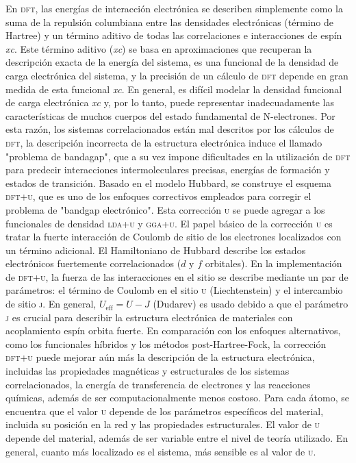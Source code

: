 En \textsc{dft}, las energías de interacción electrónica se describen simplemente como la suma de la repulsión columbiana  entre las densidades electrónicas (término de Hartree) y un término aditivo de todas las correlaciones e interacciones de espín \textit{xc}. Este término aditivo (\textit{xc}) se basa en aproximaciones que  recuperan la descripción exacta de la energía del sistema, es una funcional de la densidad de carga electrónica del sistema, y la precisión de un cálculo de \textsc{dft} depende en gran medida de esta funcional \textit{xc}. En general, es difícil modelar la densidad funcional de carga electrónica \textit{xc} y, por lo tanto, puede representar inadecuadamente las características de muchos cuerpos del estado fundamental de N-electrones. Por esta razón, los sistemas correlacionados están mal descritos por los cálculos de \textsc{dft}, la descripción incorrecta de la estructura electrónica induce el llamado "problema de bandagap", que a su vez impone dificultades en la utilización de \textsc{dft} para predecir interacciones intermoleculares precisas, energías de formación y estados de transición\cite{Tolba2018}. Basado en el modelo Hubbard, se construye el esquema \textsc{dft+u}, que es uno de los enfoques correctivos empleados para corregir el problema de "bandgap electrónico". Esta corrección \textsc{u} se puede agregar a los funcionales de densidad  \textsc{lda+u} y \textsc{gga+u}. El papel básico de la corrección \textsc{u} es tratar la fuerte interacción de Coulomb de sitio de los electrones localizados con un término adicional. El Hamiltoniano de Hubbard describe los estados electrónicos fuertemente correlacionados ($ d $ y $ f $ orbitales). En la implementación de \textsc{dft+u}, la fuerza de las interacciones en el sitio se describe mediante un par de parámetros: el término de Coulomb en el sitio \textsc{u} (Liechtenstein\cite{Lichtenstein1995StrongOrdering}) y el intercambio de sitio \textsc{j}. En general, $ U_{\text{eff}}=U-J$ (Dudarev\cite{Dudarev1998Electron-energy-lossStudy}) es usado debido a que el parámetro \textsc{j} es crucial para describir la estructura electrónica de materiales con acoplamiento espín orbita fuerte. En comparación con los enfoques alternativos, como los funcionales híbridos y los métodos post-Hartree-Fock, la corrección \textsc{dft+u} puede mejorar aún más la descripción de la estructura electrónica, incluidas las propiedades magnéticas y estructurales de los sistemas correlacionados, la energía de transferencia de electrones y las reacciones químicas, además de ser computacionalmente menos costoso. Para cada átomo, se encuentra que el valor \textsc{u} depende de los parámetros específicos del material, incluida su posición en la red y las propiedades estructurales. El valor de \textsc{u} depende del material, además de ser variable entre el nivel de teoría utilizado. En general, cuanto más localizado es el sistema, más sensible es al valor de \textsc{u}\cite{Tolba2018}.


